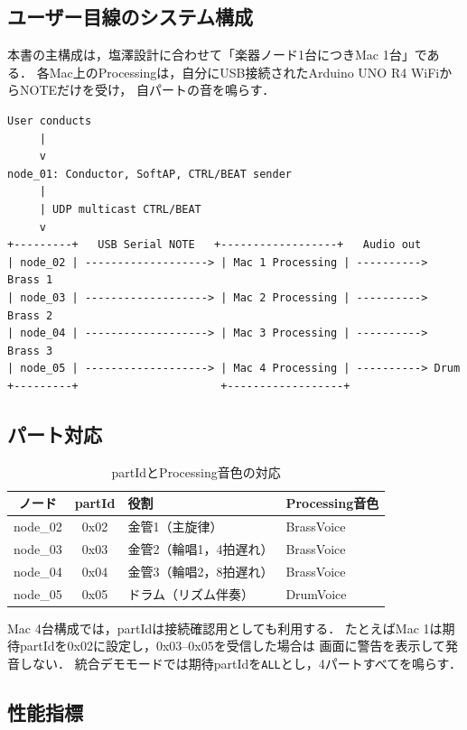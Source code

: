 \documentclass[a4paper,11pt]{jsarticle}
\begin{document}
\subsection{ユーザー目線のシステム構成}

本書の主構成は，塩澤設計に合わせて「楽器ノード1台につきMac 1台」である．
各Mac上のProcessingは，自分にUSB接続されたArduino UNO R4 WiFiからNOTEだけを受け，
自パートの音を鳴らす．

\begin{lstlisting}[style=textdiagram, caption={Processing音源サブシステムを含む全体構成}]
User conducts
     |
     v
node_01: Conductor, SoftAP, CTRL/BEAT sender
     |
     | UDP multicast CTRL/BEAT
     v
+---------+   USB Serial NOTE   +------------------+   Audio out
| node_02 | -------------------> | Mac 1 Processing | ----------> Brass 1
| node_03 | -------------------> | Mac 2 Processing | ----------> Brass 2
| node_04 | -------------------> | Mac 3 Processing | ----------> Brass 3
| node_05 | -------------------> | Mac 4 Processing | ----------> Drum
+---------+                      +------------------+
\end{lstlisting}

\subsection{パート対応}

\begin{table}[htbp]
\centering
\caption{partIdとProcessing音色の対応}
\label{tab:part}
\begin{tabular}{ccll}
\hline
ノード & partId & 役割 & Processing音色 \\
\hline
node\_02 & 0x02 & 金管1（主旋律） & BrassVoice \\
\hline
node\_03 & 0x03 & 金管2（輪唱1，4拍遅れ） & BrassVoice \\
\hline
node\_04 & 0x04 & 金管3（輪唱2，8拍遅れ） & BrassVoice \\
\hline
node\_05 & 0x05 & ドラム（リズム伴奏） & DrumVoice \\
\hline
\end{tabular}
\end{table}

Mac 4台構成では，partIdは接続確認用としても利用する．
たとえばMac 1は期待partIdを0x02に設定し，0x03--0x05を受信した場合は
画面に警告を表示して発音しない．
統合デモモードでは期待partIdを\texttt{ALL}とし，4パートすべてを鳴らす．

\subsection{性能指標}
\end{document}
